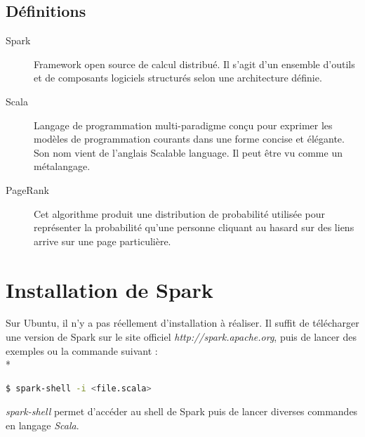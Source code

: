 \documentclass{article}
\begin{document}
\subsection{D\'{e}finitions}
\label{definitions}
\begin{description}
\item[Spark]
Framework open source de calcul distribu\'{e}. Il s'agit d'un ensemble d'outils et de composants logiciels structur\'{e}s selon une architecture d\'{e}finie.
\item[Scala]
Langage de programmation multi-paradigme con\c{c}u pour exprimer les mod\`{e}les de programmation courants dans une forme concise et \'{e}l\'{e}gante. Son nom vient de l'anglais Scalable language. Il peut \^{e}tre vu comme un m\'{e}talangage. 
\item[PageRank]
Cet algorithme produit une distribution de probabilit\'{e} utilis\'{e}e pour repr\'{e}senter la probabilit\'{e} qu'une personne cliquant au hasard sur des liens arrive sur une page particuli\`{e}re.
\end{description} 
 

\section{Installation de Spark}

Sur Ubuntu, il n'y a pas r\'{e}ellement d'installation \`{a} r\'{e}aliser. Il suffit de t\'{e}l\'{e}charger une version de Spark sur le site officiel \textit{http://spark.apache.org}, puis de lancer des exemples ou la commande suivant : \\*

\begin{tcolorbox}
\begin{lstlisting}[language=sh]
$ spark-shell -i <file.scala>
\end{lstlisting}
\end{tcolorbox}

\textit{spark-shell} permet d'acc\'{e}der au shell de Spark puis de lancer diverses commandes en langage \textit{Scala}.
 
\end{document}
